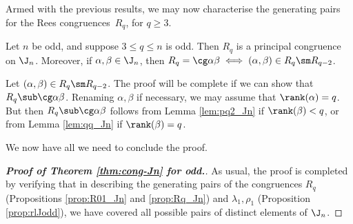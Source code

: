 Armed with the previous results, we may now characterise the generating pairs for the Rees congruences~$R_q$, for $q\geq3$.




\begin{prop}\label{prop:Rq_Jn}
Let $n$ be odd, and suppose $3\leq q\leq n$ is odd.  Then $R_q$ is a principal congruence on $\J_n$.  Moreover, if $\alpha,\beta\in\J_n$, then $R_q=\cg\alpha\beta\iff(\alpha,\beta)\in R_q\sm R_{q-2}$.
\end{prop}

\pf Let $(\alpha,\beta)\in R_q\sm R_{q-2}$.  The proof will be complete if we can show that $R_q\sub\cg\alpha\beta$.  Renaming $\alpha,\beta$ if necessary, we may assume that $\rank(\alpha)=q$.  But then $R_q\sub\cg\alpha\beta$ follows from Lemma \ref{lem:pq2_Jn} if $\rank(\beta)<q$, or from Lemma \ref{lem:qq_Jn} if $\rank(\beta)=q$. \epf

We now have all we need to conclude the proof.

\begin{proof}[{\bf Proof of Theorem \ref{thm:cong-Jn} for  odd.}]
As usual, the proof is completed by verifying that in describing the generating pairs of the congruences $R_q$
(Propositions \ref{prop:R01_Jn} and \ref{prop:Rq_Jn}) and $\lambda_1,\rho_1$
(Proposition \ref{prop:rlJodd}), we have covered all possible pairs of distinct elements of $\J_n$.
\end{proof}
